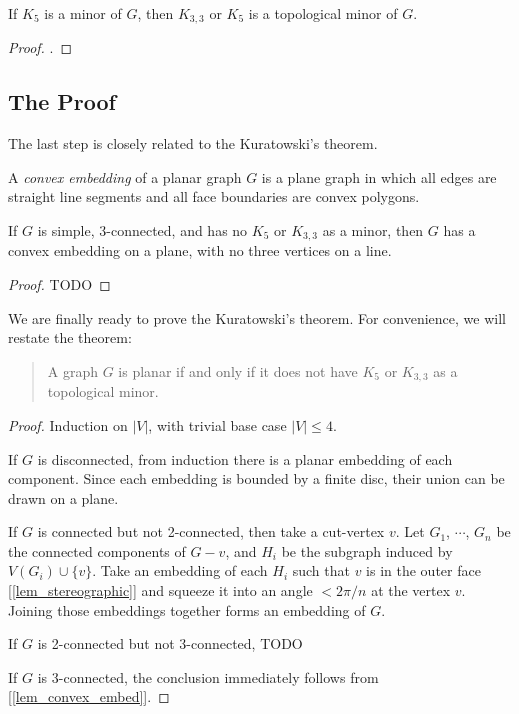         \begin{lemma} \label{lem_minor2}
            If $K_5$ is a minor of $G$, then $K_{3,3}$ or $K_5$ is a topological minor of $G$.
        \end{lemma}
        
        \begin{proof}
            .
        \end{proof}
    
    \subsection{The Proof}
    
        The last step is closely related to the Kuratowski's theorem.
    
        \begin{defn} \label{def_convex_embed}
            A \emph{convex embedding} of a planar graph $G$ is a plane graph in which all edges are straight line segments and all face boundaries are convex polygons.
        \end{defn}
        
        \begin{lemma} \label{lem_convex_embed}
            If $G$ is simple, 3-connected, and has no $K_5$ or $K_{3,3}$ as a minor, then $G$ has a convex embedding on a plane, with no three vertices on a line.
        \end{lemma}
        
        \begin{proof}
            TODO
        \end{proof}
        
        We are finally ready to prove the Kuratowski's theorem. For convenience, we will restate the theorem:
        
        \begin{quote}
            A graph $G$ is planar if and only if it does not have $K_5$ or $K_{3,3}$ as a topological minor.
        \end{quote}
        
        \begin{proof}
            Induction on $|V|$, with trivial base case $|V| \leq 4$.
            
            If $G$ is disconnected, from induction there is a planar embedding of each component. Since each embedding is bounded by a finite disc, their union can be drawn on a plane.
            
            If $G$ is connected but not 2-connected, then take a cut-vertex $v$. Let $G_1$, $\cdots$, $G_n$ be the connected components of $G-v$, and $H_i$ be the subgraph induced by $V(G_i) \cup \{v\}$. Take an embedding of each $H_i$ such that $v$ is in the outer face [\ref{lem_stereographic}] and squeeze it into an angle $< 2\pi / n$ at the vertex $v$. Joining those embeddings together forms an embedding of $G$.
            
            If $G$ is 2-connected but not 3-connected, TODO
            
            If $G$ is 3-connected, the conclusion immediately follows from [\ref{lem_convex_embed}].
        \end{proof}
    

